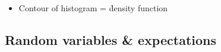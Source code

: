 \documentclass[t]{beamer} %
\begin{document}
\begin{frame}
\begin{center}
  \end{center}

  \ungap[1]
  \begin{itemize}
  \item<5-> Contour of histogram = \h{density function}
  \end{itemize}
\end{frame}

\subsection{Random variables \& expectations}
\end{document}
